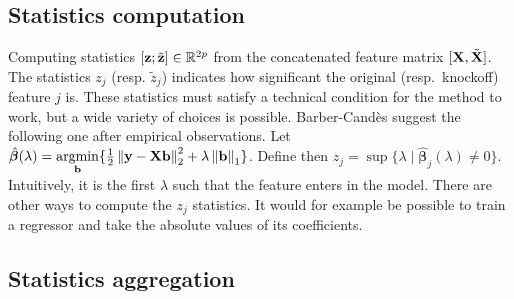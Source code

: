 \subsection{Statistics computation}\label{subsec:ksc}

Computing statistics $\left[ \mathbf{z}; \tilde{\mathbf{z}} \right] \in \mathbb{R}^{2p}$ from the concatenated feature matrix
$[\mathbf{X}, \tilde{\mathbf{X}}]$.
The statistics $z_j$ (resp. $\tilde{z}_j$) indicates how significant the original (resp.\ knockoff) feature $j$ is.
These statistics must satisfy a technical condition for the method to work,
but a wide variety of choices is possible.
Barber-Candès suggest the following one after empirical observations.
Let $\hat{\bm{\beta}}(\lambda) = \underset{\mathbf{b}}{\operatorname{argmin}}
\{\frac{1}{2}\left\lVert\mathbf{y} - \mathbf{X}\mathbf{b}\right\rVert_2^2 + \lambda\left\lVert\mathbf{b}\right\rVert_1\}$.
Define then $z_j = \sup\{\lambda \mid \mathbf{\hat{\beta}}_j(\lambda) \neq 0\}$.
Intuitively, it is the first $\lambda$ such that the feature enters in the model.
There are other ways to compute the $z_j$ statistics.
It would for example be possible to train a regressor and take the absolute values of its coefficients.

\subsection{Statistics aggregation}\label{subsec:ksa}

